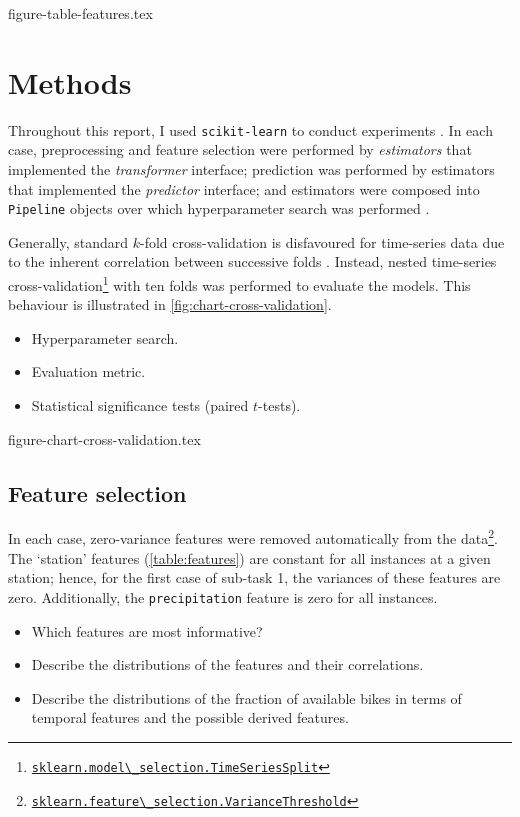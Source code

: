 \documentclass[11pt]{extarticle}
\newcommand{\sklearn}[1]{
  \href{https://scikit-learn.org/stable/modules/generated/sklearn.#1.html}{\lstinline|sklearn.#1|}
}
\begin{document}
{figure-table-features.tex}

\section{Methods}
\label{sec:methods}

Throughout this report, I used \texttt{scikit-learn} to conduct experiments
\parencite{Pedregosa2011}.
In each case, preprocessing and feature selection were performed by \emph{estimators}
that implemented the \emph{transformer} interface; prediction was performed by
estimators that implemented the \emph{predictor} interface; and estimators were
composed into \texttt{Pipeline} objects over which hyperparameter search was performed
\parencite[4-9]{Buitinck2013}.

Generally, standard $k$-fold cross-validation is disfavoured for time-series data due
to the inherent correlation between successive folds \parencite{Bergmeir2018}.
Instead, nested time-series
cross-validation\footnote{\sklearn{model\_selection.TimeSeriesSplit}} with ten folds
was performed to evaluate the models.
This behaviour is illustrated in \cref{fig:chart-cross-validation}.

\begin{itemize}
  \item Hyperparameter search.
  \item Evaluation metric.
  \item Statistical significance tests (paired $t$-tests).
\end{itemize}

{figure-chart-cross-validation.tex}

\subsection{Feature selection}
\label{sec:feature-selection}

In each case, zero-variance features were removed automatically from the
data\footnote{\sklearn{feature\_selection.VarianceThreshold}}.
The `station' features (\cref{table:features}) are constant for all instances at a given station; hence, for
the first case of sub-task 1, the variances of these features are zero.
Additionally, the \texttt{precipitation} feature is zero for all instances.

\begin{itemize}
  \item Which features are most informative?
  \item Describe the distributions of the features and their correlations.
  \item Describe the distributions of the fraction of available bikes in terms of
        temporal features and the possible derived features.
\end{itemize}

\printbibliography
\end{document}
